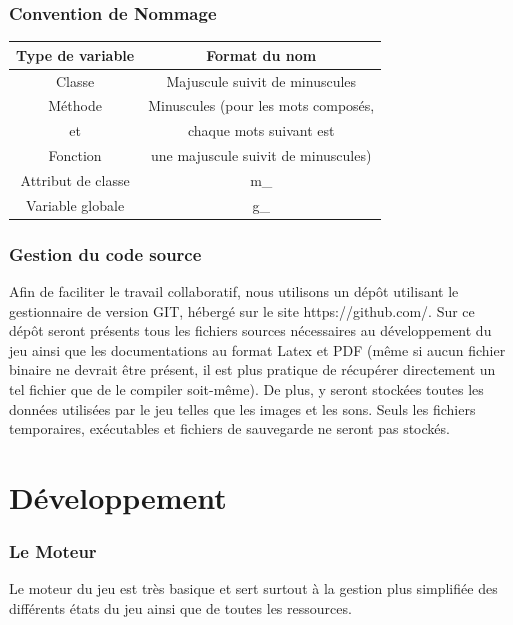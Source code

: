 \documentclass[a4paper]{article}
\newcommand{\alinea}{\hspace*{0.5cm}}
\begin{document}
    \section{Convention de Nommage}
      \begin{small}
        \begin{tabular}{| c | c |}
          \hline
          \textbf{Type de variable} & \textbf{Format du nom}\\
          \hline
          Classe & Majuscule suivit de minuscules\\
          \hline
          Méthode & Minuscules (pour les mots composés,\\
          et & chaque mots suivant est\\
          Fonction & une majuscule suivit de minuscules)\\
          \hline
          Attribut de classe & m\_\\
          \hline
          Variable globale & g\_\\
          \hline
        \end{tabular}
      \end{small}

    \section{Gestion du code source}
      \alinea Afin de faciliter le travail collaboratif, nous utilisons un dépôt utilisant le gestionnaire de version GIT, hébergé sur le site https://github.com/. Sur ce dépôt seront présents tous les fichiers sources nécessaires au développement du jeu ainsi que les documentations au format Latex et PDF (même si aucun fichier binaire ne devrait être présent, il est plus pratique de récupérer directement un tel fichier que de le compiler soit-même). De plus, y seront stockées toutes les données utilisées par le jeu telles que les images et les sons. Seuls les fichiers temporaires, exécutables et fichiers de sauvegarde ne seront pas stockés.
		
\newpage
  \part{Développement}
    \section{Le Moteur}
      \alinea Le moteur du jeu est très basique et sert surtout à la gestion plus simplifiée des différents états du jeu ainsi que de toutes les ressources.
      
\end{document}
